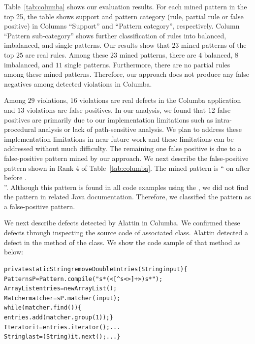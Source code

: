 {Table~\ref{tab:columba} shows our evaluation results. For each mined pattern in the top 25, the table shows support and pattern category (rule, partial rule or false positive) in Columns ``Support'' and ``Pattern category'', respectively. Column ``Pattern sub-category'' shows further classification of rules into balanced, imbalanced, and single patterns. Our results show that $23$ mined patterns of the top $25$ are real rules. Among these $23$ mined patterns, there are $4$ balanced, $8$ imbalanced, and $11$ single patterns. Furthermore, there are no partial rules among these mined patterns.
Therefore, our approach does not produce any false negatives among detected violations in Columba.

Among $29$ violations, $16$ violations are real defects in the Columba application and $13$ violations are false positives.
In our analysis, we found that $12$ false positives are primarily due to our implementation limitations such as intra-procedural analysis or lack of path-sensitive analysis. We plan to address these implementation limitations in near future work and these limitations can be addressed without much difficulty. The remaining one false positive is due to a false-positive pattern mined by our approach. We next describe the false-positive pattern shown in Rank 4 of Table~\ref{tab:columba}. The mined pattern is `` on  after  before .\\''. Although this pattern is found in all code examples using the , we did not find the pattern in related Java documentation. Therefore, we classified the pattern as a false-positive pattern.

We next describe defects detected by Alattin in Columba. We confirmed these defects through inspecting the source code of associated class. Alattin detected a defect in the  method of the  class. We show the code sample of that method as below:\vspace{-1ex}

\begin{CodeOut}
\begin{alltt}
private static String removeDoubleEntries(String input) \{
\hspace*{0.1in}Pattern sP = Pattern.compile("s*(<[^s<>]+>)s*");
\hspace*{0.1in}ArrayList entries = new ArrayList();
\hspace*{0.1in}Matcher matcher = sP.matcher(input);
\hspace*{0.1in}while (matcher.find()) \{
\hspace*{0.3in}entries.add(matcher.group(1));	\}
\hspace*{0.1in}Iterator it = entries.iterator(); ...
\hspace*{0.1in}String last = (String) it.next(); ... \}
\end{alltt}
\end{CodeOut}\vspace{-1ex}

}
